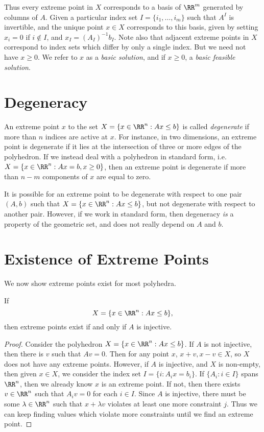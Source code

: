 Thus every extreme point in $X$ corresponds to a basis of $\RR^m$ generated by columns of $A$. Given a particular index set $I = \{ i_1, \dots, i_m \}$ such that $A^I$ is invertible, and the unique point $x \in X$ corresponds to this basis, given by setting $x_i = 0$ if $i \not \in I$, and $x_I = (A_I)^{-1}b_I$. Note also that adjacent extreme points in $X$ correspond to index sets which differ by only a single index. But we need not have $x \geq 0$. We refer to $x$ as a \emph{basic solution}, and if $x \geq 0$, a \emph{basic feasible solution}.

\section{Degeneracy}

An extreme point $x$ to the set $X = \{ x \in \RR^n: Ax \leq b \}$ is called \emph{degenerate} if more than $n$ indices are active at $x$. For instance, in two dimensions, an extreme point is degenerate if it lies at the intersection of three or more edges of the polyhedron. If we instead deal with a polyhedron in standard form, i.e. $X = \{ x \in \RR^n: Ax = b, x \geq 0 \}$, then an extreme point is degenerate if more than $n - m$ components of $x$ are equal to zero.

It is possible for an extreme point to be degenerate with respect to one pair $(A,b)$ such that $X = \{ x \in \RR^n: Ax \leq b \}$, but not degenerate with respect to another pair. However, if we work in standard form, then degeneracy \emph{is} a property of the geometric set, and does not really depend on $A$ and $b$.

\section{Existence of Extreme Points}

We now show extreme points exist for most polyhedra.

\begin{lemma}
    If
    \[ X = \{ x \in \RR^n: Ax \leq b \}, \]
    then extreme points exist if and only if $A$ is injective.
\end{lemma}
\begin{proof}
    Consider the polyhedron $X = \{ x \in \RR^n : Ax \leq b \}$. If $A$ is not injective, then there is $v$ such that $Av = 0$. Then for any point $x$, $x + v, x - v \in X$, so $X$ does not have any extreme points. However, if $A$ is injective, and $X$ is non-empty, then given $x \in X$, we consider the index set $I = \{ i : A_ix = b_i \}$. If $\{ A_i : i \in I \}$ spans $\RR^n$, then we already know $x$ is an extreme point. If not, then there exists $v \in \RR^n$ such that $A_i v = 0$ for each $i \in I$. Since $A$ is injective, there must be some $\lambda \in \RR^n$ such that $x + \lambda v$ violates at least one more constraint $j$. Thus we can keep finding values which violate more constraints until we find an extreme point.
\end{proof}

